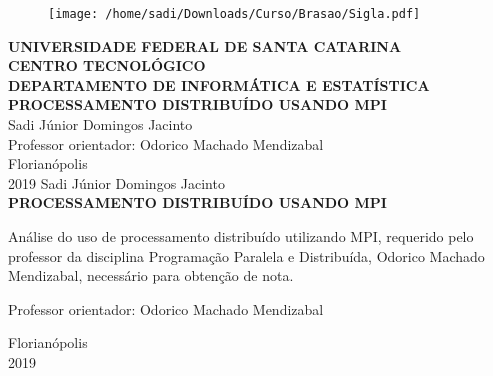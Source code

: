 \documentclass[12pt,a4paper,brazil,abntex2]{article}
\begin{document}
\singlespacing
\begin{titlepage}
\begin{center}
\begin{figure}[!htb]
\center
\texttt{[image: /home/sadi/Downloads/Curso/Brasao/Sigla.pdf]} 
\end{figure}
{\bf  UNIVERSIDADE FEDERAL DE SANTA CATARINA}\\[0.2cm]
{\bf CENTRO TECNOLÓGICO}\\[0.2cm]
{\bf  DEPARTAMENTO DE INFORMÁTICA E ESTATÍSTICA}\\[5.5cm]
{\bf \large PROCESSAMENTO DISTRIBUÍDO USANDO MPI}\\[3.6 cm]
{Sadi Júnior Domingos Jacinto}\\[1cm]
{Professor orientador: Odorico Machado Mendizabal}\\[4.9 cm]
{Florianópolis}\\[0.2cm]
{2019}
\newpage
\thispagestyle{empty}
{Sadi Júnior Domingos Jacinto}\\[9cm]
{\bf \large PROCESSAMENTO DISTRIBUÍDO USANDO MPI}\\[0.5cm]
    \begin{flushright}
    \begin{list}{}{
      \setlength{\leftmargin}{7.2cm}
      \setlength{\rightmargin}{0cm}
      \setlength{\labelwidth}{0pt}
      \setlength{\labelsep}{\leftmargin}}
      \item Análise do uso de processamento distribuído utilizando MPI, requerido pelo professor da disciplina Programação Paralela e Distribuída, Odorico Machado Mendizabal, necessário para obtenção de nota.\\[0.2 cm] 
      \setlength{\labelsep}{\leftmargin}
      \item Professor orientador: Odorico Machado Mendizabal\
      \\[9cm]
     \end{list}
	 \end{flushright}
{Florianópolis}\\[0.2cm]
{2019}
\end{center}
\end{titlepage} %
\newpage
\thispagestyle{empty}
\tableofcontents








\end{document}
